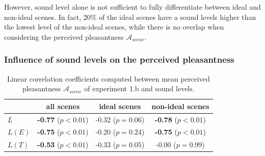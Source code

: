 \documentclass[12pt]{elsarticle}
\newcommand{\vs}{\emph{vs.}}
\begin{document}

However, sound level alone is not sufficient to fully differentiate between ideal and non-ideal scenes. In fact, $20\%$ of the ideal scenes have a sound levels higher than the lowest level of the non-ideal scenes, while there is no overlap when considering the perceived pleasantness $\mathcal{A}_{scene}$.

\subsubsection*{Influence of sound levels on the perceived pleasantness}

\begin{table}[t]
\centering
\begin{tabular}{l c c c}
               & all scenes                & ideal scenes          & non-ideal scenes      \\
\hline
$L$            & \textbf{-0.77} ($p<0.01$) & -0.32 ($p=0.06$)  & \textbf{-0.78} ($p<0.01$) \\
$L(E)$         & \textbf{-0.75} ($p<0.01$) & -0.20 ($p=0.24$)  & \textbf{-0.75} ($p<0.01$) \\
$L(T)$         & \textbf{-0.53} ($p<0.01$) & -0.33 ($p=0.05$)  &  -0.00 ($p=0.99$)         \\
\hline
\end{tabular}
\vspace{0.5mm}
\caption{Linear correlation coefficients computed between mean perceived pleasantness $\mathcal{A}_{scene}$ of experiment 1.b and sound levels.}
\label{tab:corrStructA}
\end{table}

\end{document}

